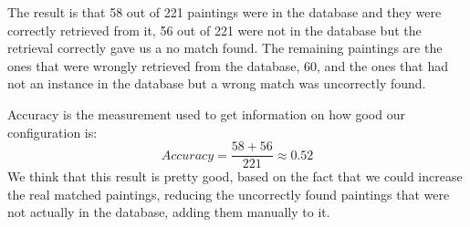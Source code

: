 The result is that 58 out of 221 paintings were in the database and they were correctly retrieved from it, 56 out of 221 were not in the database but the retrieval correctly gave us a no match found. The remaining paintings are the ones that were wrongly retrieved from the database, 60, and the ones that had not an instance in the database but a wrong match was uncorrectly found.

Accuracy is the measurement used to get information on how good our configuration is: \[ Accuracy = \frac{58+56}{221} \approx 0.52 \]
We think that this result is pretty good, based on the fact that we could increase the real matched paintings, reducing the uncorrectly found paintings that were not actually in the database, adding them manually to it.
